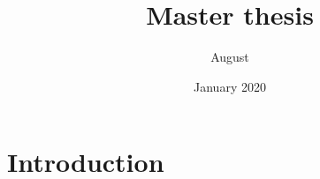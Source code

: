 \documentclass{article}
\title{Master thesis}
\author{August }
\date{January 2020}
\begin{document}
\maketitle

\section{Introduction}
\end{document}
